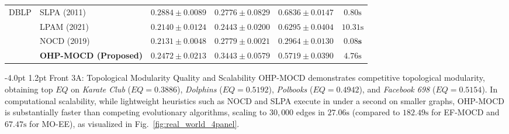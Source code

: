 \documentclass{svproc}
\makeatletter
\renewcommand\subsection{\@startsection{subsection}{2}{\z@}%
  {-4.0pt \@plus -0.5pt \@minus -0.5pt}%
  {1.2pt \@plus 0.5pt}%
  {\normalfont\normalsize\bfseries\boldmath}}
\makeatother
\begin{document}
\begin{table}[t]
{\begin{tabular}{@{}llcccc@{}}
\midrule
DBLP & SLPA (2011) & $\mathbf{0.2884 \pm 0.0089}$ & $0.2776 \pm 0.0829$ & $\mathbf{0.6836 \pm 0.0147}$ & $0.80\text{s}$ \\
 & LPAM (2021) & $0.2140 \pm 0.0124$ & $0.2443 \pm 0.0200$ & $0.6295 \pm 0.0404$ & $10.31\text{s}$ \\
 & NOCD (2019) & $0.2131 \pm 0.0048$ & $0.2779 \pm 0.0021$ & $0.2964 \pm 0.0130$ & $\mathbf{0.08\text{s}}$ \\
 & \textbf{OHP-MOCD (Proposed)} & $0.2472 \pm 0.0213$ & $\mathbf{0.3443 \pm 0.0579}$ & $0.5719 \pm 0.0390$ & $4.76\text{s}$ \\
\bottomrule
\end{tabular}%
}
\end{table}

\subsection{Front 3A: Topological Modularity Quality and Scalability}\label{subsec:modularity_and_runtime}
OHP-MOCD demonstrates competitive topological modularity, obtaining top $EQ$ on \textit{Karate Club} ($EQ = 0.3886$), \textit{Dolphins} ($EQ = 0.5192$), \textit{Polbooks} ($EQ = 0.4942$), and \textit{Facebook 698} ($EQ = 0.5154$). In computational scalability, while lightweight heuristics such as NOCD and SLPA execute in under a second on smaller graphs, OHP-MOCD is substantially faster than competing evolutionary algorithms, scaling to $30{,}000$ edges in $27.06\text{s}$ (compared to $182.49\text{s}$ for EF-MOCD and $67.47\text{s}$ for MO-EE), as visualized in Fig.~\ref{fig:real_world_4panel}.
\end{document}
